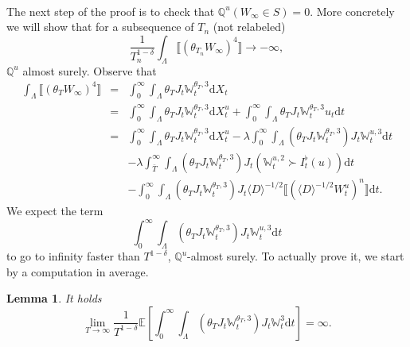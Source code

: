 \documentclass[11pt]{article}
\newcommand{\mathd}{\mathrm{d}}
\newtheorem{lemma}{Lemma}
\begin{document}
\

The next step of the proof is to check that $\mathbb{Q}^u (W_{\infty} \in S)
= 0$. More concretely we will show that for a subsequence of $T_n$ (not
relabeled)
\[ \frac{1}{T_n^{1 - \delta}} \int_{\Lambda} \llbracket (\theta_{T_n}
   W_{\infty})^4 \rrbracket \rightarrow - \infty, \]
$\mathbb{Q}^u$ almost surely. Observe that
\[ \begin{array}{lll}
     \int_{\Lambda} \llbracket (\theta_T W_{\infty})^4 \rrbracket & = &
     \int^{\infty}_0 \int_{\Lambda} \theta_T J_t \mathbb{W}_t^{\theta_T, 3}
     \mathd X_t\\
     & = & \int^{\infty}_0 \int_{\Lambda} \theta_T J_t
     \mathbb{W}_t^{\theta_T, 3} \mathd X^u_t + \int^{\infty}_0 \int_{\Lambda}
     \theta_T J_t \mathbb{W}_t^{\theta_T, 3} u_t \mathd t\\
     & = & \int^{\infty}_0 \int_{\Lambda} \theta_T J_t
     \mathbb{W}_t^{\theta_T, 3} \mathd X^u_t - \lambda \int^{\infty}_0
     \int_{\Lambda} (\theta_T J_t \mathbb{W}_t^{\theta_T, 3}) J_t
     \mathbb{W}_t^{u, 3} \mathd t\\
     &  & - \lambda \int^{\infty}_{\bar{T}} \int_{\Lambda} (\theta_T J_t
     \mathbb{W}_t^{\theta_T, 3}) J_t (\mathbb{W}_t^{u, 2} \succ I^{\flat}_t
     (u)) \mathd t\\
     &  & - \int^{\infty}_0 \int_{\Lambda} (\theta_T J_t
     \mathbb{W}_t^{\theta_T, 3}) J_t \langle D \rangle^{- 1 / 2} \llbracket
     (\langle D \rangle^{- 1 / 2} W^u_t)^n \rrbracket \mathd t.
   \end{array} \]
\[ \  \]
We expect the term
\[ \int^{\infty}_0 \int_{\Lambda} (\theta_T J_t \mathbb{W}_t^{\theta_T, 3})
   J_t \mathbb{W}_t^{u, 3} \mathd t \]
to go to infinity faster than $T^{1 - \delta}$, $\mathbb{Q}^u$-almost surely.
To actually prove it, we start by a computation in average.

\begin{lemma}
  It holds
  \[ \lim_{T \rightarrow \infty} \frac{1}{T^{1 - \delta}} \mathbb{E} \left[
     \int^{\infty}_0 \int_{\Lambda} (\theta_T J_t \mathbb{W}_t^{\theta_T, 3})
     J_t \mathbb{W}_t^3 \mathd t \right] = \infty . \]
\end{lemma}
\end{document}
